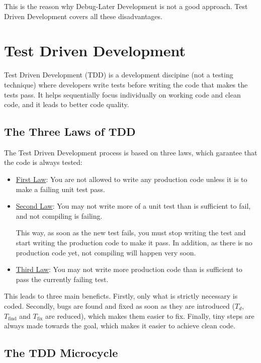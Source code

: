 This is the reason why Debug-Later Development is not a good approach. Test Driven Development covers all these disadvantages.

\section{Test Driven Development}

Test Driven Development (TDD) is a development discipine (not a testing technique) where developers write tests before writing the code that makes the tests pass. It helps sequentially focus individually on working code and clean code, and it leads to better code quality. 

\subsection{The Three Laws of TDD}

The Test Driven Development process is based on three laws, which garantee that the code is always tested:
\begin{itemize}
    \item \ul{First Law}: You are not allowed to write any production code unless it is to make a failing unit test pass.    
    \item \ul{Second Law}: You may not write more of a unit test than is sufficient to fail, and not compiling is failing.
    
    This way, as soon as the new test fails, you must stop writing the test and start writing the production code to make it pass. In addition, as there is no production code yet, not compiling will happen very soon.
    \item \ul{Third Law}: You may not write more production code than is sufficient to pass the currently failing test.    
\end{itemize}

This leads to three main beneficts. Firstly, only what is strictly necessary is coded. Secondly, bugs are found and fixed as soon as they are introduced ($T_d$, $T_{\text{find}}$ and $T_{\text{fix}}$ are reduced), which makes them easier to fix. Finally, tiny steps are always made towards the goal, which makes it easier to achieve clean code.

\subsection{The TDD Microcycle}

